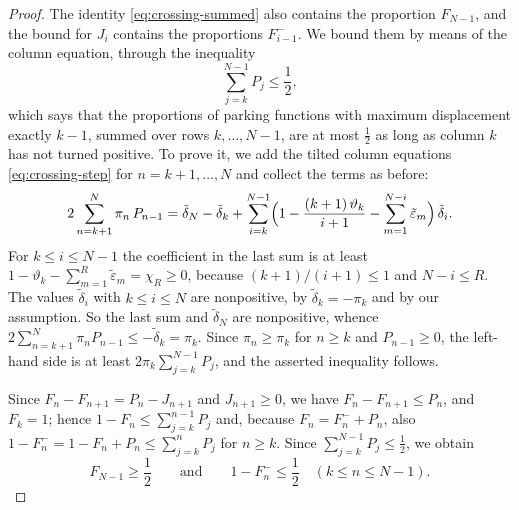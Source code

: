 \documentclass{amsart}
\theoremstyle{definition}
\theoremstyle{remark}
\numberwithin{equation}{section}
\begin{document}
\begin{proof}
The identity \eqref{eq:crossing-summed} also contains the proportion $F_{N-1}$, and the bound for $J_i$ contains the proportions $F^-_{i-1}$. We bound them by means of the column equation, through the inequality
\[
\sum_{j=k}^{N-1}P_j\le\frac12 ,
\]
which says that the proportions of parking functions with maximum displacement exactly $k-1$, summed over rows $k,\dots,N-1$, are at most $\frac12$ as long as column $k$ has not turned positive. To prove it, we add the tilted column equations \eqref{eq:crossing-step} for $n=k+1,\dots,N$ and collect the terms as before:
\[
2\sum_{n=k+1}^{N}\pi_n\,P_{n-1}=\tilde\delta_N-\tilde\delta_k+\sum_{i=k}^{N-1}\Bigl(1-\frac{(k+1)\,\vartheta_k}{i+1}-\sum_{m=1}^{N-i}\tilde\varepsilon_m\Bigr)\,\tilde\delta_i .
\]
For $k\le i\le N-1$ the coefficient in the last sum is at least $1-\vartheta_k-\sum_{m=1}^{R}\tilde\varepsilon_m=\chi_R\ge 0$, because $(k+1)/(i+1)\le 1$ and $N-i\le R$. The values $\tilde\delta_i$ with $k\le i\le N$ are nonpositive, by $\tilde\delta_k=-\pi_k$ and by our assumption. So the last sum and $\tilde\delta_N$ are nonpositive, whence $2\sum_{n=k+1}^{N}\pi_nP_{n-1}\le-\tilde\delta_k=\pi_k$. Since $\pi_n\ge\pi_k$ for $n\ge k$ and $P_{n-1}\ge 0$, the left-hand side is at least $2\pi_k\sum_{j=k}^{N-1}P_j$, and the asserted inequality follows.

Since $F_n-F_{n+1}=P_n-J_{n+1}$ and $J_{n+1}\ge 0$, we have $F_n-F_{n+1}\le P_n$, and $F_k=1$; hence $1-F_n\le\sum_{j=k}^{n-1}P_j$ and, because $F_n=F^-_n+P_n$, also $1-F^-_n=1-F_n+P_n\le\sum_{j=k}^{n}P_j$ for $n\ge k$. Since $\sum_{j=k}^{N-1}P_j\le\frac12$, we obtain
\[
F_{N-1}\ge\frac12\qquad\text{and}\qquad 1-F^-_n\le\frac12\quad(k\le n\le N-1).
\]


\end{proof}
\end{document}
